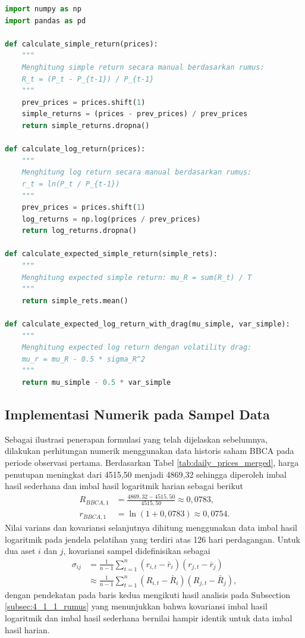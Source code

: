 \begin{lstlisting}[language=Python, caption={Fungsi prapemrosesan imbal hasil dan ekspektasi pertumbuhan portofolio}, label={lst:calc_returns}]
import numpy as np
import pandas as pd

def calculate_simple_return(prices):
    """
    Menghitung simple return secara manual berdasarkan rumus:
    R_t = (P_t - P_{t-1}) / P_{t-1}
    """
    prev_prices = prices.shift(1)
    simple_returns = (prices - prev_prices) / prev_prices
    return simple_returns.dropna()

def calculate_log_return(prices):
    """
    Menghitung log return secara manual berdasarkan rumus:
    r_t = ln(P_t / P_{t-1})
    """
    prev_prices = prices.shift(1)
    log_returns = np.log(prices / prev_prices)
    return log_returns.dropna()

def calculate_expected_simple_return(simple_rets):
    """
    Menghitung expected simple return: mu_R = sum(R_t) / T
    """
    return simple_rets.mean()

def calculate_expected_log_return_with_drag(mu_simple, var_simple):
    """
    Menghitung expected log return dengan volatility drag:
    mu_r = mu_R - 0.5 * sigma_R^2
    """
    return mu_simple - 0.5 * var_simple
\end{lstlisting}

\subsection{Implementasi Numerik pada Sampel Data}
\label{subsec:4_1_2_numerik_fisis}

Sebagai ilustrasi penerapan formulasi yang telah dijelaskan sebelumnya, dilakukan perhitungan numerik menggunakan data historis saham BBCA pada periode observasi pertama. Berdasarkan Tabel \ref{tab:daily_prices_merged}, harga penutupan meningkat dari 4515,50 menjadi 4869,32 sehingga diperoleh imbal hasil sederhana dan imbal hasil logaritmik harian sebagai berikut
\begin{equation*}
\begin{aligned}
R_{BBCA,1}
&=
\frac{4869,32-4515,50}{4515,50}
\approx 0,0783,\\
r_{BBCA,1}
&=
\ln(1+0,0783)
\approx 0,0754.
\end{aligned}
\end{equation*}
Nilai varians dan kovariansi selanjutnya dihitung menggunakan data imbal hasil logaritmik pada jendela pelatihan yang terdiri atas 126 hari perdagangan. Untuk dua aset $i$ dan $j$, kovariansi sampel didefinisikan sebagai
\begin{equation}
\begin{aligned}
\sigma_{ij}
&=
\frac{1}{n-1}
\sum_{t=1}^{n}
(r_{i,t}-\bar r_i)
(r_{j,t}-\bar r_j) \\
&\approx
\frac{1}{n-1}
\sum_{t=1}^{n}
(R_{i,t}-\bar R_i)
(R_{j,t}-\bar R_j),
\end{aligned}
\end{equation}
dengan pendekatan pada baris kedua mengikuti hasil analisis pada Subsection \ref{subsec:4_1_1_rumus} yang menunjukkan bahwa kovariansi imbal hasil logaritmik dan imbal hasil sederhana bernilai hampir identik untuk data imbal hasil harian.

